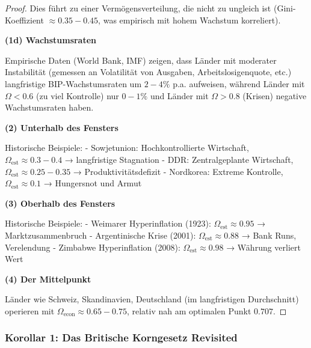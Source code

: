 \documentclass[a4paper,12pt,twoside]{report}
\theoremstyle{definition}
\begin{document}
\begin{proof}
Dies führt zu einer Vermögensverteilung, die nicht zu ungleich ist (Gini-Koeffizient $\approx 0.35-0.45$, was empirisch mit hohem Wachstum korreliert).

\textbf{(1d) Wachstumsraten}

Empirische Daten (World Bank, IMF) zeigen, dass Länder mit moderater Instabilität (gemessen an Volatilität von Ausgaben, Arbeitslosigenquote, etc.) langfristige BIP-Wachstumsraten um $2-4\%$ p.a. aufweisen, während Länder mit $\Omega < 0.6$ (zu viel Kontrolle) nur $0-1\%$ und Länder mit $\Omega > 0.8$ (Krisen) negative Wachstumsraten haben.

\textbf{(2) Unterhalb des Fensters}

Historische Beispiele:
- Sowjetunion: Hochkontrollierte Wirtschaft, $\Omega_{\text{est}} \approx 0.3-0.4$ → langfristige Stagnation
- DDR: Zentralgeplante Wirtschaft, $\Omega_{\text{est}} \approx 0.25-0.35$ → Produktivitätsdefizit
- Nordkorea: Extreme Kontrolle, $\Omega_{\text{est}} \approx 0.1$ → Hungersnot und Armut

\textbf{(3) Oberhalb des Fensters}

Historische Beispiele:
- Weimarer Hyperinflation (1923): $\Omega_{\text{est}} \approx 0.95$ → Marktzusammenbruch
- Argentinische Krise (2001): $\Omega_{\text{est}} \approx 0.88$ → Bank Runs, Verelendung
- Zimbabwe Hyperinflation (2008): $\Omega_{\text{est}} \approx 0.98$ → Währung verliert Wert

\textbf{(4) Der Mittelpunkt}

Länder wie Schweiz, Skandinavien, Deutschland (im langfristigen Durchschnitt) operieren mit $\Omega_{\text{econ}} \approx 0.65-0.75$, relativ nah am optimalen Punkt $0.707$.

\end{proof}

\subsubsection{Korollar 1: Das Britische Korngesetz Revisited}
\end{document}
